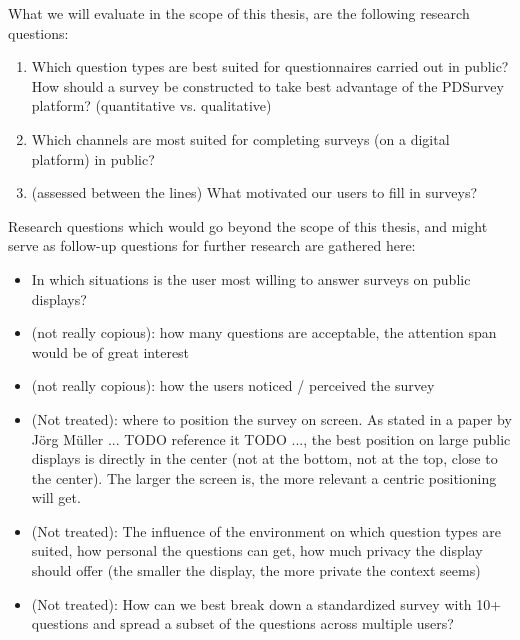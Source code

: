 	What we will evaluate in the scope of this thesis, are the following research questions:

	\begin{enumerate}
	\item Which question types are best suited for questionnaires carried out in public? How should a survey be constructed to take best advantage of the PDSurvey platform? (quantitative vs. qualitative)

	\item Which channels are most suited for completing surveys (on a digital platform) in public?

	\item (assessed between the lines) What motivated our users to fill in surveys?
	\end{enumerate}


	Research questions which would go beyond the scope of this thesis, and might serve as follow-up questions for further research are gathered here:

	\begin{itemize}
	\item In which situations is the user most willing to answer surveys on public displays?
	\item (not really copious): how many questions are acceptable, the attention span would be of great interest
	\item (not really copious): how the users noticed / perceived the survey
	\item (Not treated): where to position the survey on screen. As stated in a paper by J\"org M\"uller ... TODO reference it TODO ..., the best position on large public displays is directly in the center (not at the bottom, not at the top, close to the center). The larger the screen is, the more relevant a centric positioning will get.
	\item (Not treated): The influence of the environment on which question types are suited, how personal the questions can get, how much privacy the display should offer (the smaller the display, the more private the context seems)
	\item (Not treated): How can we best break down a standardized survey with 10+ questions and spread a subset of the questions across multiple users?
	\end{itemize}

